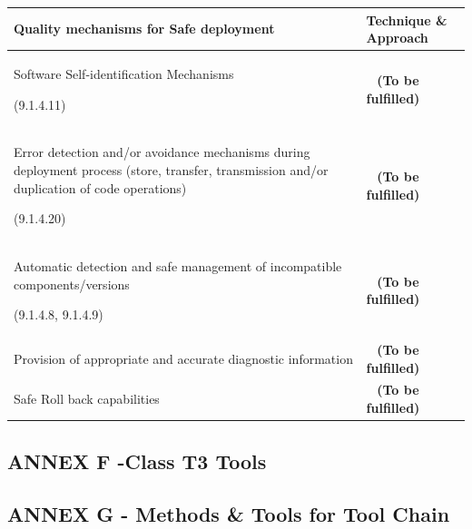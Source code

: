 \documentclass{template/openetcs_article}
\begin{document}
\begin{flushleft}
\tablefirsthead{}
\tablehead{}
\tabletail{}
\tablelasttail{}
\begin{supertabular}{|m{7,5cm}|m{7cm}|}
\hline
{}
Quality mechanisms for Safe deployment &
Technique \& Approach\\\hline
Software Self-identification Mechanisms

(9.1.4.11) &
~
\textbf{(To be fulfilled)} \\\hline
Error detection and/or avoidance mechanisms during deployment process (store, transfer, transmission and/or duplication of code operations)

(9.1.4.20) &
~
\textbf{(To be fulfilled)} \\\hline
Automatic detection and safe management of incompatible components/versions

(9.1.4.8, 9.1.4.9) &
~
\textbf{(To be fulfilled)} \\\hline
Provision of appropriate and accurate diagnostic information &
~
\textbf{(To be fulfilled)} \\\hline
Safe Roll back capabilities  &
~
\textbf{(To be fulfilled)} \\\hline
\end{supertabular}
\end{flushleft}

\subsection{ANNEX F -Class T3 Tools}
\subsection{ANNEX G - Methods \& Tools for Tool Chain}





\end{document}
